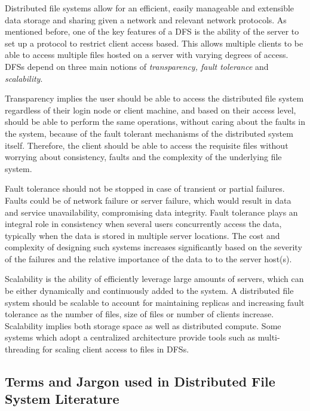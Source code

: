 \documentclass{article}
\begin{document}
Distributed file systems allow for an efficient, easily manageable and extensible data storage and sharing given a network and relevant network protocols. As mentioned before, one of the key features of a DFS is the ability of the server to set up a protocol to restrict client access based. This allows multiple clients to be able to access multiple files hosted on a server with varying degrees of access. DFSs depend on three main notions of \textit{transparency, fault tolerance} and \textit{scalability}.

Transparency \cite{floyd1989transparency} implies the user should be able to access the distributed file system regardless of their login node or client machine, and based on their access level, should be able to perform the same operations, without caring about the faults in the system, because of the fault tolerant mechanisms of the distributed system itself. Therefore, the client should be able to access the requisite files without worrying about consistency, faults and the complexity of the underlying file system.

Fault tolerance \cite{becker1994application} should not be stopped in case of transient or partial failures. Faults could be of network failure or server failure, which would result in data and service unavailability, compromising data integrity. Fault tolerance plays an integral role in consistency when several users concurrently access the data, typically when the data is stored in multiple server locations. The cost and complexity of designing such systems increases significantly based on the severity of the failures and the relative importance of the data to to the server host(s).

Scalability \cite{mccreadie2012mapreduce} is the ability of efficiently leverage large amounts of servers, which can be either dynamically and continuously added to the system. A distributed file system should be scalable to account for maintaining replicas and increasing fault tolerance as the number of files, size of files or number of clients increase. Scalability implies both storage space as well as distributed compute. Some systems which adopt a centralized architecture provide tools such as multi-threading for scaling client access to files in DFSs.

\subsection{Terms and Jargon used in Distributed File System Literature}
\end{document}
